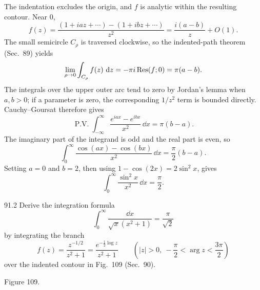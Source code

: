 \documentclass[11pt,oneside]{article}
\begin{document}
\begin{solution}
The indentation excludes the origin, and $f$ is analytic within the resulting contour. Near $0$,
\[
    f(z)=\frac{(1+iaz+\cdots)-(1+ibz+\cdots)}{z^2}
    =\frac{i(a-b)}z+O(1).
\]
The small semicircle $C_\rho$ is traversed clockwise, so the indented-path theorem (Sec.~89) yields
\[
    \lim_{\rho\to0}\int_{C_\rho}f(z)\,\mathop{}\!\mathrm{d} z
      =-\pi i\operatorname{Res}(f;0)=\pi(a-b).
\]
The integrals over the upper outer arc tend to zero by Jordan's lemma when $a,b>0$; if a parameter is zero, the corresponding $1/z^2$ term is bounded directly. Cauchy--Goursat therefore gives
\[
    \operatorname{P.V.}\!\int_{-\infty}^{\infty}
        \frac{e^{iax}-e^{ibx}}{x^2}\,\dd x=\pi(b-a).
\]
The imaginary part of the integrand is odd and the real part is even, so
\[
    \boxed{\int_0^\infty\frac{\cos(ax)-\cos(bx)}{x^2}\,\dd x
      =\frac\pi2(b-a).}
\]
Setting $a=0$ and $b=2$, then using $1-\cos(2x)=2\sin^2x$, gives
\[
    \boxed{\int_0^\infty\frac{\sin^2x}{x^2}\,\dd x=\frac\pi2.}
\]
\end{solution}

\begin{exercise}{91.2}
Derive the integration formula
\[
    \int_0^\infty\frac{\dd x}{\sqrt{x}(x^2+1)}
      =\frac\pi{\sqrt2}
\]
by integrating the branch
\[
    f(z)=\frac{z^{-1/2}}{z^2+1}
       =\frac{e^{-\frac12\log z}}{z^2+1}
    \qquad\left(|z|>0,\ -\frac\pi2<\arg z<\frac{3\pi}2\right)
\]
over the indented contour in Fig.~109 (Sec.~90).
\begin{center}
\par\small Figure 109.
\end{center}
\end{exercise}
\end{document}
